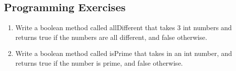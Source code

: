 \subsection{Programming Exercises}

\setcounter{counter}{1}
\begin{enumerate}[label={\arabic{counter}\addtocounter{counter}{1}}.]

\item Write a boolean method called allDifferent that takes 3 int numbers and returns true if the numbers are all different, and false otherwise.

\item Write a boolean method called isPrime that takes in an int number, and returns true if the number is prime, and false otherwise.

\end{enumerate}